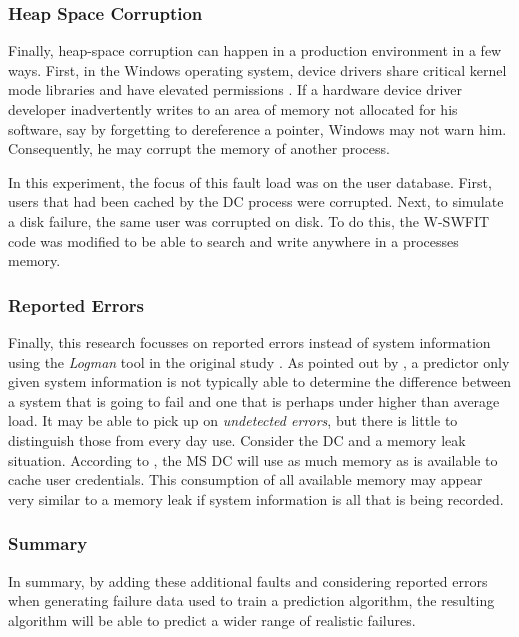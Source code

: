 \subsubsection{Heap Space Corruption} \label{sec:extHeapSpaceCorrupt}
Finally, heap-space corruption can happen in a production environment in a few
ways.  First, in the Windows operating system, device drivers share critical
kernel mode libraries and have elevated permissions \citep{russinovich2009}.
If a hardware device driver developer inadvertently writes to an area of memory
not allocated for his software, say by forgetting to dereference a pointer,
Windows may not warn him.  Consequently, he may corrupt the memory of another
process.

In this experiment, the focus of this fault load was on the user database.
First, users that had been cached by the \ac{DC} process were corrupted.  Next,
to simulate a disk failure, the same user was corrupted on disk.  To do this,
the \ac{W-SWFIT} code was modified to be able to search and write anywhere in a
processes memory.

\subsubsection{Reported Errors} \label{sec:extReportedErrors}
Finally, this research focusses on reported errors instead of system
information using the \emph{Logman} tool in the original study
\citep{irrera2015}.  As pointed out by \citet{salfnerSurvey}, a predictor only
given system information is not typically able to determine the difference
between a system that is going to fail and one that is perhaps under higher
than average load.  It may be able to pick up on \emph{undetected errors}, but
there is little to distinguish those from every day use.  Consider the \ac{DC}
and a memory leak situation.  According to \citet{russinovich2009}, the \ac{MS}
\ac{DC} will use as much memory as is available to cache user credentials.
This consumption of all available memory may appear very similar to a memory
leak if system information is all that is being recorded.

\subsubsection{Summary} \label{sec:extSum}
In summary, by adding these additional faults and considering reported errors
when generating failure data used to train a prediction algorithm, the
resulting algorithm will be able to predict a wider range of realistic
failures.  
